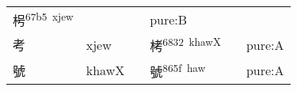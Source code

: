 \documentclass[14pt,a4paper]{scrartcl}
\begin{document}
\begin{longtable}[c]{@{}llllll@{}}
\begin{minipage}[t]{0.14\columnwidth}
枵\textsuperscript{67b5~xjew}
\strut\end{minipage} &
\begin{minipage}[t]{0.14\columnwidth}\raggedright\strut
\strut\end{minipage} &
\begin{minipage}[t]{0.14\columnwidth}\raggedright\strut
\strut\end{minipage} &
\begin{minipage}[t]{0.14\columnwidth}\raggedright\strut
pure:B
\strut\end{minipage}\tabularnewline
\begin{minipage}[t]{0.14\columnwidth}\raggedright\strut
考
\strut\end{minipage} &
\begin{minipage}[t]{0.14\columnwidth}\raggedright\strut
xjew
\strut\end{minipage} &
\begin{minipage}[t]{0.14\columnwidth}\raggedright\strut
\strut\end{minipage} &
\begin{minipage}[t]{0.14\columnwidth}\raggedright\strut
栲\textsuperscript{6832~khawX}
\strut\end{minipage} &
\begin{minipage}[t]{0.14\columnwidth}\raggedright\strut
\strut\end{minipage} &
\begin{minipage}[t]{0.14\columnwidth}\raggedright\strut
pure:A
\strut\end{minipage}\tabularnewline
\begin{minipage}[t]{0.14\columnwidth}\raggedright\strut
號
\strut\end{minipage} &
\begin{minipage}[t]{0.14\columnwidth}\raggedright\strut
khawX
\strut\end{minipage} &
\begin{minipage}[t]{0.14\columnwidth}\raggedright\strut
\strut\end{minipage} &
\begin{minipage}[t]{0.14\columnwidth}\raggedright\strut
號\textsuperscript{865f~haw}
\strut\end{minipage} &
\begin{minipage}[t]{0.14\columnwidth}\raggedright\strut
\strut\end{minipage} &
\begin{minipage}[t]{0.14\columnwidth}\raggedright\strut
pure:A
\strut\end{minipage}\tabularnewline

\end{longtable}
\end{document}
